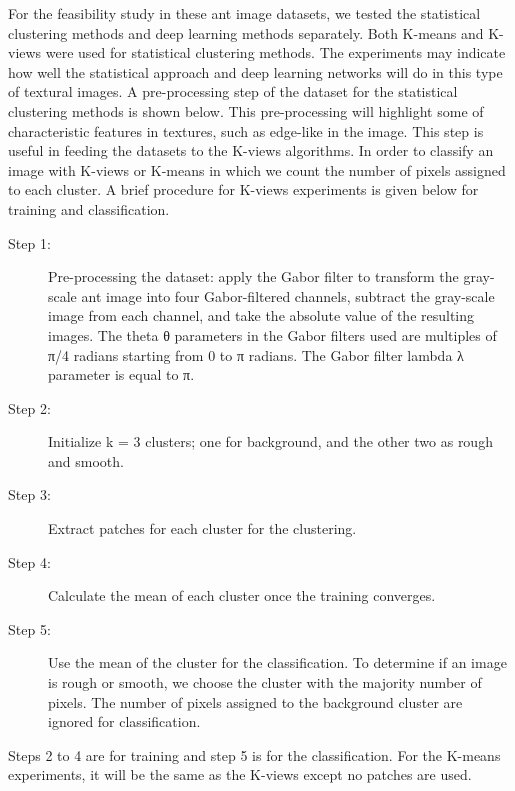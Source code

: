 \documentclass{aci}
\numberwithin{equation}{section}
\begin{document}
For the feasibility study in these ant image datasets, we tested the statistical
clustering methods and deep learning methods separately. Both K-means and
K-views were used for statistical clustering methods. The experiments may
indicate how well the statistical approach and deep learning networks will do in
this type of textural images. A pre-processing step of the dataset for the
statistical clustering methods is shown below. This pre-processing will
highlight some of characteristic features in textures, such as edge-like in the
image. This step is useful in feeding the datasets to the K-views algorithms. In
order to classify an image with K-views or K-means in which we count the number
of pixels assigned to each cluster. A brief procedure for K-views experiments is
given below for training and classification.
\begin{description}
    \item[Step 1:] Pre-processing the dataset: apply the Gabor filter to
          transform the gray-scale ant image into four Gabor-filtered channels,
          subtract the gray-scale image from each channel, and take the absolute
          value of the resulting images. The theta θ parameters in the Gabor
          filters used are multiples of π/4 radians starting from 0 to π
          radians. The Gabor filter lambda λ parameter is equal to π.

    \item[Step 2:] Initialize k = 3 clusters; one for background, and the other
          two as rough and smooth.

    \item[Step 3:] Extract patches for each cluster for the clustering.

    \item[Step 4:] Calculate the mean of each cluster once the training
          converges.

    \item[Step 5:] Use the mean of the cluster for the classification. To
          determine if an image is rough or smooth, we choose the cluster with
          the majority number of pixels. The number of pixels assigned to the
          background cluster are ignored for classification.
\end{description}

\noindent Steps 2 to 4 are for training and step 5 is for the classification.
For the K-means experiments, it will be the same as the K-views except no
patches are used.
\newline
\end{document}
